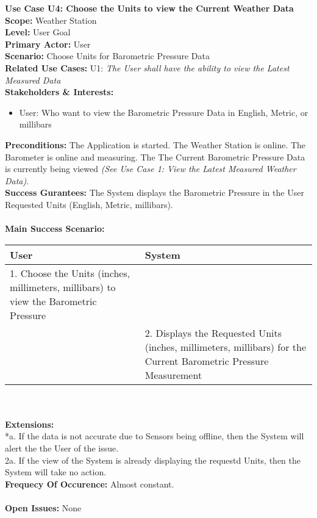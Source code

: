 \documentclass[letterpaper]{article}
\begin{document}
\noindent
\textbf{Use Case U4:  Choose the Units to view the Current Weather
Data}\\
\textbf{Scope:  }Weather Station\\
\textbf{Level:  }User Goal\\
\textbf{Primary Actor:  }User\\
\textbf{Scenario:  }Choose Units for Barometric Pressure Data\\
\textbf{Related Use Cases:  }U1: \textit{The User shall have the
ability to view the Latest Measured Data}\\
\textbf{Stakeholders \& Interests:  }
\begin{itemize}
\item User:  Who want to view the Barometric Pressure Data in
English, Metric, or millibars
\end{itemize}
\textbf{Preconditions:  }The Application is started.  The Weather
Station is online.  The Barometer is online and measuring.  The
The Current Barometric Pressure Data is currently being viewed
\textit{(See Use Case 1:  View the Latest Measured Weather Data)}.\\
\textbf{Success Gurantees:  }The System displays the Barometric
Pressure in the User Requested Units (English, Metric, millibars).
\\\\
\textbf{Main Success Scenario:  }\\
\begin{tabular}{|p{6cm}|p{6cm}|}\hline
\textbf{User} & \textbf{System}\\\hline
 1.  Choose the Units (inches, millimeters, millibars) to view
 the Barometric Pressure & \\\hline
& 2.  Displays the Requested Units (inches, millimeters, millibars)
for the Current Barometric Pressure Measurement\\\hline
\end{tabular}\\\\
\textbf{Extensions:  }\\
*a.  If the data is not accurate due to Sensors being offline, then
the System will alert the the User of the issue.\\
2a.  If the view of the System is already displaying the requestd
Units, then the System will take no action.\\
\textbf{Frequecy Of Occurence: } Almost constant.\\\\
\textbf{Open Issues: } None
\end{document}
